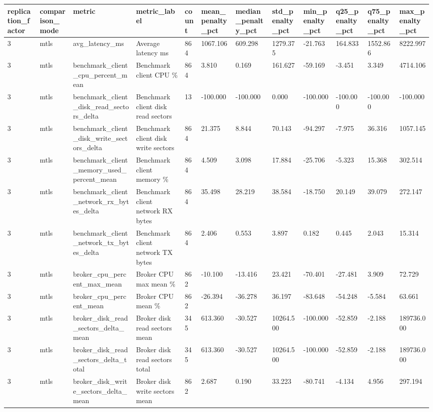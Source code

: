 \begin{longtable}{llllllllllll}
\hline
replication\_factor & comparison\_mode & metric & metric\_label & count & mean\_penalty\_pct & median\_penalty\_pct & std\_penalty\_pct & min\_penalty\_pct & q25\_penalty\_pct & q75\_penalty\_pct & max\_penalty\_pct \\
\hline
3 & mtls & avg\_latency\_ms & Average latency ms & 864 & 1067.106 & 609.298 & 1279.375 & -21.763 & 164.833 & 1552.866 & 8222.997 \\
3 & mtls & benchmark\_client\_cpu\_percent\_mean & Benchmark client CPU \% & 864 & 3.810 & 0.169 & 161.627 & -59.169 & -3.451 & 3.349 & 4714.106 \\
3 & mtls & benchmark\_client\_disk\_read\_sectors\_delta & Benchmark client disk read sectors & 13 & -100.000 & -100.000 & 0.000 & -100.000 & -100.000 & -100.000 & -100.000 \\
3 & mtls & benchmark\_client\_disk\_write\_sectors\_delta & Benchmark client disk write sectors & 864 & 21.375 & 8.844 & 70.143 & -94.297 & -7.975 & 36.316 & 1057.145 \\
3 & mtls & benchmark\_client\_memory\_used\_percent\_mean & Benchmark client memory \% & 864 & 4.509 & 3.098 & 17.884 & -25.706 & -5.323 & 15.368 & 302.514 \\
3 & mtls & benchmark\_client\_network\_rx\_bytes\_delta & Benchmark client network RX bytes & 864 & 35.498 & 28.219 & 38.584 & -18.750 & 20.149 & 39.079 & 272.147 \\
3 & mtls & benchmark\_client\_network\_tx\_bytes\_delta & Benchmark client network TX bytes & 864 & 2.406 & 0.553 & 3.897 & 0.182 & 0.445 & 2.043 & 15.314 \\
3 & mtls & broker\_cpu\_percent\_max\_mean & Broker CPU max mean \% & 862 & -10.100 & -13.416 & 23.421 & -70.401 & -27.481 & 3.909 & 72.729 \\
3 & mtls & broker\_cpu\_percent\_mean & Broker CPU mean \% & 862 & -26.394 & -36.278 & 36.197 & -83.648 & -54.248 & -5.584 & 63.661 \\
3 & mtls & broker\_disk\_read\_sectors\_delta\_mean & Broker disk read sectors mean & 345 & 613.360 & -30.527 & 10264.500 & -100.000 & -52.859 & -2.188 & 189736.000 \\
3 & mtls & broker\_disk\_read\_sectors\_delta\_total & Broker disk read sectors total & 345 & 613.360 & -30.527 & 10264.500 & -100.000 & -52.859 & -2.188 & 189736.000 \\
3 & mtls & broker\_disk\_write\_sectors\_delta\_mean & Broker disk write sectors mean & 862 & 2.687 & 0.190 & 33.223 & -80.741 & -4.134 & 4.956 & 297.194 \\

\end{longtable}
